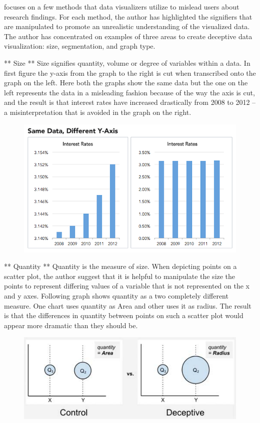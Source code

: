 \documentclass[]{book}
\theoremstyle{definition}
\theoremstyle{definition}
\theoremstyle{definition}
\theoremstyle{remark}
\begin{document}
\citep{visual-lies} focuses on a few methods that data visualizers
utilize to mislead users about research findings. For each method, the
author has highlighted the signifiers that are manipulated to promote an
unrealistic understanding of the visualized data. The author has
concentrated on examples of three areas to create deceptive data
visualization: size, segmentation, and graph type.

** Size ** Size signifies quantity, volume or degree of variables within
a data. In first figure the y-axis from the graph to the right is cut
when transcribed onto the graph on the left. Here both the graphs show
the same data but the one on the left represents the data in a
misleading fashion because of the way the axis is cut, and the result is
that interest rates have increased drastically from 2008 to 2012 -- a
misinterpretation that is avoided in the graph on the right.

\begin{figure}
\centering
\includegraphics{images/Size1.png}
\caption{}
\end{figure}

** Quantity ** Quantity is the measure of size. When depicting points on
a scatter plot, the author suggest that it is helpful to manipulate the
size the points to represent differing values of a variable that is not
represented on the x and y axes. Following graph shows quantity as a two
completely different measure. One chart uses quantity as Area and other
uses it as radius. The result is that the differences in quantity
between points on such a scatter plot would appear more dramatic than
they should be.

\begin{figure}
\centering
\includegraphics{images/Quantity1.png}
\caption{}
\end{figure}
\end{document}

